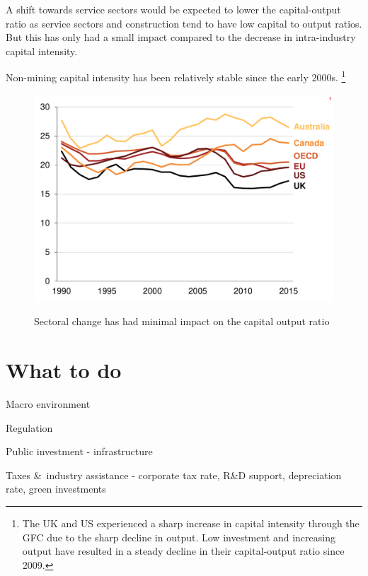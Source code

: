 A shift towards service sectors would be expected to lower the capital-output ratio as service sectors and construction tend to have low capital to output ratios. But this has only had a small impact compared to the decrease in intra-industry capital intensity.

Non-mining capital intensity has been relatively stable since the early 2000s. \footnote{The UK and US experienced a sharp increase in capital intensity through the GFC due to the sharp decline in output. Low investment and increasing output have resulted in a steady decline in their capital-output ratio since 2009.}

\begin{figure}[p] 
 \caption{Sectoral change has had minimal impact on the capital output ratio}
 \includegraphics[page=9]{atlas/Ch2.pdf}\label{fig:sectorshift}

\end{figure}

\section{What to do}

Macro environment

Regulation

Public investment - infrastructure

Taxes \&\ industry assistance - corporate tax rate, R\&D support, depreciation rate, green investments

